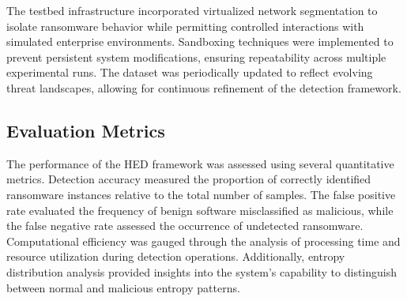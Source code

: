 \documentclass[lettersize,journal]{IEEEtran}
\begin{document}
\begin{table}[h]
	\centering
	\caption{Experimental Environment Configuration}
	\label{tab:exp_setup}
\end{table}

The testbed infrastructure incorporated virtualized network segmentation to isolate ransomware behavior while permitting controlled interactions with simulated enterprise environments. Sandboxing techniques were implemented to prevent persistent system modifications, ensuring repeatability across multiple experimental runs. The dataset was periodically updated to reflect evolving threat landscapes, allowing for continuous refinement of the detection framework.


\subsection{Evaluation Metrics}

The performance of the HED framework was assessed using several quantitative metrics. Detection accuracy measured the proportion of correctly identified ransomware instances relative to the total number of samples. The false positive rate evaluated the frequency of benign software misclassified as malicious, while the false negative rate assessed the occurrence of undetected ransomware. Computational efficiency was gauged through the analysis of processing time and resource utilization during detection operations. Additionally, entropy distribution analysis provided insights into the system's capability to distinguish between normal and malicious entropy patterns.
\end{document}
